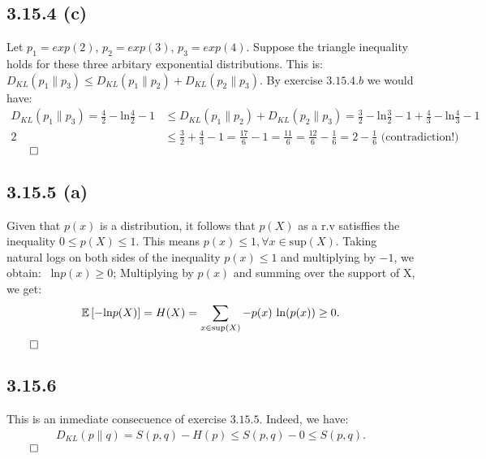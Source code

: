 \documentclass{exam}
\renewenvironment{proof}{{\noindent\itshape\ignorespaces}}{{\hfill$\qed$\\}}
\begin{document}
\subsection*{3.15.4 (c)}
Let $p_1 = exp(2)$, $p_2 = exp(3)$, $p_3 = exp(4)$. Suppose the triangle inequality holds for these three arbitary exponential distributions. This is:\\
$D_{KL}(p_1 \lVert p_3) \leq D_{KL}(p_1 \lVert p_2) + D_{KL}(p_2 \lVert p_3)$. By exercise $3.15.4.b$ we would have:
\begin{proof}
    \begin{equation*}
        \begin{aligned}
            D_{KL}(p_1 \lVert p_3) = \frac{4}{2} - \text{ln}\frac{4}{2} - 1  &\leq D_{KL}(p_1 \lVert p_2) + D_{KL}(p_2 \lVert p_3) = \frac{3}{2} - \text{ln}\frac{3}{2} - 1 + \frac{4}{3} - \text{ln}\frac{4}{3} - 1\\
            2 &\leq \frac{3}{2} + \frac{4}{3} -1  = \frac{17}{6} - 1 = \frac{11}{6} = \frac{12}{6} - \frac{1}{6} = 2 - \frac{1}{6} \text{ (contradiction!)}
        \end{aligned}
    \end{equation*}
\end{proof}

\subsection*{3.15.5 (a)}
Given that $p(x)$ is a distribution, it follows that $p(X)$  as a r.v satisffies the inequality $0 \leq p(X) \leq 1$. This means $p(x) \leq 1, \forall x \in \text{sup}\left( X \right)$. Taking natural logs on both sides of the inequality $p(x) \leq 1$ and multiplying by $-1$, we obtain: \ $\text{ln}p(x) \geq 0$; Multiplying by $p(x)$ and summing over the support of X, we get:\\
\begin{proof}
    \begin{equation*}
        \begin{aligned}
             \mathbb{E}\left[ - \text{ln}p(X) \right] = H(X) = \displaystyle \sum_{\tiny x \in \text{sup}\left( X \right)}-p(x) \ \text{ln}(p(x)) \geq 0 \text{.}
        \end{aligned}
    \end{equation*}
\end{proof}

\subsection*{3.15.6}
This is an inmediate consecuence of exercise $3.15.5$. Indeed, we have:\\
\begin{proof}
    \begin{equation*}
        \begin{aligned}
            D_{KL}(p \lVert q) = S(p,q) - H(p) \leq S(p,q) - 0  \leq S(p,q) \text{.}
        \end{aligned}
    \end{equation*}
\end{proof}
\end{document}
